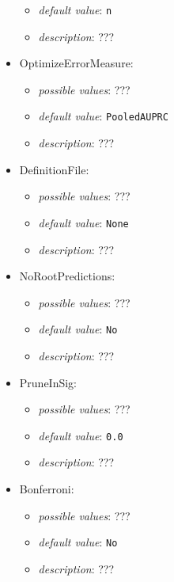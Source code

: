 \documentclass{article}
\begin{document}
\begin{itemize}
\begin{itemize}
                \item \emph{default value}: \texttt{n}
                \item \emph{description}: ???
           \end{itemize}
    \item OptimizeErrorMeasure:
           \begin{itemize}
                \item \emph{possible values}: ???
                \item \emph{default value}: \texttt{PooledAUPRC}
                \item \emph{description}: ???
           \end{itemize}
    \item DefinitionFile:
           \begin{itemize}
                \item \emph{possible values}: ???
                \item \emph{default value}: \texttt{None}
                \item \emph{description}: ???
           \end{itemize}
    \item NoRootPredictions:
           \begin{itemize}
                \item \emph{possible values}: ???
                \item \emph{default value}: \texttt{No}
                \item \emph{description}: ???
           \end{itemize}
    \item PruneInSig:
           \begin{itemize}
                \item \emph{possible values}: ???
                \item \emph{default value}: \texttt{0.0}
                \item \emph{description}: ???
           \end{itemize}
    \item Bonferroni:
           \begin{itemize}
                \item \emph{possible values}: ???
                \item \emph{default value}: \texttt{No}
                \item \emph{description}: ???
           \end{itemize}

\end{itemize}
\end{document}
